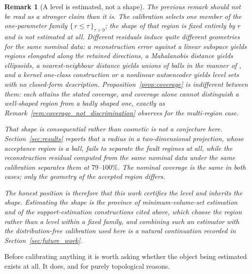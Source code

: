 \documentclass[a4paper]{cas-sc}
\newtheorem{remark}{Remark}
\newcommand{\residual}{\ensuremath{r}}
\begin{document}
\begin{remark}[A level is estimated, not a shape]
\label{rem:level_not_shape}
The previous remark should not be read as a stronger claim than it is. The
calibration selects one member of the one-parameter family
\(\{\,\residual\le\tau\,\}_{\tau>0}\); the \emph{shape} of that region is
fixed entirely by \(\residual\) and is not estimated at all. Different
residuals induce quite different geometries for the same nominal data: a
reconstruction error against a linear subspace yields regions elongated along
the retained directions, a Mahalanobis distance yields ellipsoids, a
nearest-neighbour distance yields unions of balls in the manner of
\citet{devroye1980}, and a kernel one-class construction
\citep{scholkopf2001} or a nonlinear autoencoder yields level sets with no
closed-form description. Proposition~\ref{prop:coverage} is indifferent
between them: each attains the stated coverage, and coverage alone cannot
distinguish a well-shaped region from a badly shaped one, exactly as
Remark~\ref{rem:coverage_not_discrimination} observes for the multi-region
case.

That shape is consequential rather than cosmetic is not a conjecture here.
Section~\ref{sec:results} reports that a radius in a two-dimensional
projection, whose acceptance region is a ball, fails to separate the fault
regimes at all, while the reconstruction residual computed from the same
nominal data under the same calibration separates them at
\(79\)--\(100\%\). The nominal coverage is the same in both cases; only the
geometry of the accepted region differs.

The honest position is therefore that this work certifies the level and
inherits the shape. Estimating the shape is the province of minimum-volume-set
estimation \citep{scott2006} and of the support-estimation constructions cited
above, which choose the region rather than a level within a fixed family, and
combining such an estimator with the distribution-free calibration used here
is a natural continuation recorded in Section~\ref{sec:future_work}.
\end{remark}

Before calibrating anything it is worth asking whether the object being
estimated exists at all. It does, and for purely topological reasons.
\end{document}
